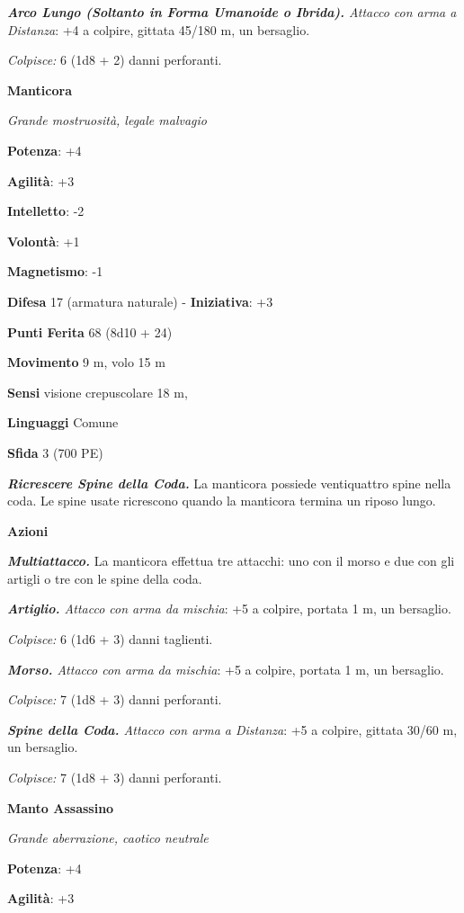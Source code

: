 \begin{multicols}{2}
\emph{\textbf{Arco Lungo (Soltanto in Forma Umanoide o Ibrida).} Attacco
con arma a Distanza}: +4 a colpire, gittata 45/180 m, un bersaglio.

\emph{Colpisce:} 6 (1d8 + 2) danni perforanti.

\textbf{Manticora}

\emph{Grande mostruosità, legale malvagio}

\textbf{Potenza}: +4

\textbf{Agilità}: +3

\textbf{Intelletto}: -2

\textbf{Volontà}: +1

\textbf{Magnetismo}: -1

\textbf{Difesa} 17 (armatura naturale) - \textbf{Iniziativa}: +3

\textbf{Punti Ferita} 68 (8d10 + 24)

\textbf{Movimento} 9 m, volo 15 m

\textbf{Sensi} visione crepuscolare 18 m, 

\textbf{Linguaggi} Comune

\textbf{Sfida} 3 (700 PE)\smallskip

\emph{\textbf{Ricrescere Spine della Coda.}} La manticora possiede
ventiquattro spine nella coda. Le spine usate ricrescono quando la
manticora termina un riposo lungo.

\smallskip\textbf{Azioni}

\emph{\textbf{Multiattacco.}} La manticora effettua tre attacchi: uno
con il morso e due con gli artigli o tre con le spine della coda.

\emph{\textbf{Artiglio.} Attacco con arma da mischia}: +5 a colpire,
portata 1 m, un bersaglio.

\emph{Colpisce:} 6 (1d6 + 3) danni taglienti.

\emph{\textbf{Morso.} Attacco con arma da mischia}: +5 a colpire,
portata 1 m, un bersaglio.

\emph{Colpisce:} 7 (1d8 + 3) danni perforanti.

\emph{\textbf{Spine della Coda.} Attacco con arma a Distanza}: +5 a
colpire, gittata 30/60 m, un bersaglio.

\emph{Colpisce:} 7 (1d8 + 3) danni perforanti.


\textbf{Manto Assassino}

\emph{Grande aberrazione, caotico neutrale}

\textbf{Potenza}: +4

\textbf{Agilità}: +3


\end{multicols}
